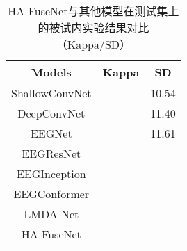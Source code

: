 \begin{table}[ht]
    \centering
    \caption{HA-FuseNet与其他模型在测试集上的被试内实验结果对比（Kappa/SD）}
    \label{tab:2bcompareinsd}
    \begin{tabularx}{\textwidth}{CCC}
      \toprule
      Models & Kappa & SD \\
      \midrule
      ShallowConvNet\cite{schirrmeister2017deep} &&10.54\\
      DeepConvNet\cite{schirrmeister2017deep} &&11.40\\
      EEGNet\cite{lawhern2018eegnet} && 11.61\\
      EEGResNet\cite{HBM:HBM23730} &&\\
      EEGInception\cite{zhang2021eeg} &&\\
      EEGConformer\cite{song2022eeg} &&\\
      LMDA-Net\cite{miao2023lmda} &&\\
      \midrule 
      HA-FuseNet \\
      \bottomrule
    \end{tabularx}
\end{table}



